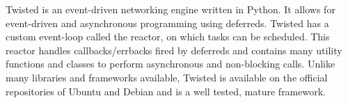 Twisted is an event-driven networking engine written in Python.
It allows for event-driven and asynchronous programming using deferreds.
Twisted has a custom event-loop called the reactor, on which tasks can be scheduled.
This reactor handles callbacks/errbacks fired by deferreds and contains many utility functions and classes to perform asynchronous and non-blocking calls.
Unlike many libraries and frameworks available, Twisted is available on the official repositories of Ubuntu and Debian and is a well tested, mature framework.

